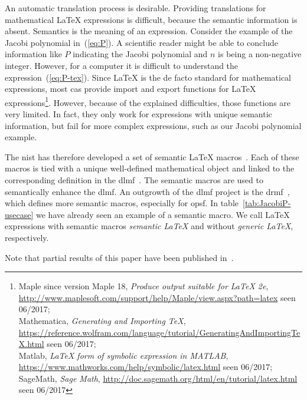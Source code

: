 An automatic translation process is desirable. Providing translations for mathematical \LaTeX{} expressions is difficult, because the semantic information is absent. Semantics is the meaning of an expression. Consider the example of the Jacobi polynomial in~(\ref{eq:P}). A scientific reader might be able to conclude information like $P$ indicating the Jacobi polynomial and $n$ is being a non-negative integer. However, for a computer it is difficult to understand the expression~(\ref{eq:P-tex}). Since \LaTeX{} is the de facto standard for mathematical expressions, most \gls*{cas} provide import and export functions for \LaTeX{} expressions\footnote{Maple since version Maple 18, \textit{Produce output suitable for LaTeX 2e}, \url{http://www.maplesoft.com/support/help/Maple/view.aspx?path=latex} seen 06/2017;\\
Mathematica, \textit{Generating and Importing TeX}, \url{https://reference.wolfram.com/language/tutorial/GeneratingAndImportingTeX.html} seen 06/2017;\\
Matlab, \textit{\LaTeX{} form of symbolic expression in MATLAB}, \url{https://www.mathworks.com/help/symbolic/latex.html} seen 06/2017;\\
SageMath, \textit{Sage Math}, \url{http://doc.sagemath.org/html/en/tutorial/latex.html} seen 06/2017}. However, because of the explained difficulties, those functions are very limited. In fact, they only work for expressions with unique semantic information, but fail for more complex expressions, such as our Jacobi polynomial example.

The \gls*{nist} has therefore developed a set of semantic \LaTeX{} macros~\parencite{DLMF:Macros}. Each of these macros is tied with a unique well-defined mathematical object and linked to the corresponding definition in the \gls*{dlmf}~\parencite{NIST:DLMF,NIST:DLMF:Paper,NIST:Handbook}. The semantic macros are used to semantically enhance the \gls*{dlmf}. An outgrowth of the \gls*{dlmf} project is the \gls*{drmf}~\parencite{DRMF:14,DRMF:15}, which defines more semantic macros, especially for \gls*{opsf}. In table~\ref{tab:JacobiP-usecase} we have already seen an example of a semantic macro. We call \LaTeX{} expressions with semantic macros \textit{semantic \LaTeX{}} and without \textit{generic \LaTeX}, respectively. 

Note that partial results of this paper have been published in~\parencite{CICM:Paper}.


